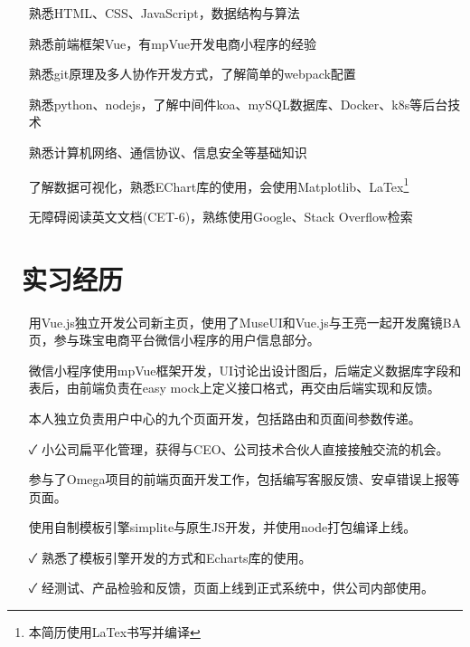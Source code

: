 \documentclass[14pt]{resume}
\begin{document}
\begin{itemize}
    \item[\faTree] 熟悉HTML、CSS、JavaScript，数据结构与算法
    \item[\faTree] 熟悉前端框架Vue，有mpVue开发电商小程序的经验
    \item[\faTree] 熟悉git原理及多人协作开发方式，了解简单的webpack配置
    \item[\faTree] 熟悉python、nodejs，了解中间件koa、mySQL数据库、Docker、k8s等后台技术
    \item[\faTree] 熟悉计算机网络、通信协议、信息安全等基础知识
    \item[\faTree] 了解数据可视化，熟悉EChart库的使用，会使用Matplotlib、LaTex\footnote{本简历使用LaTex书写并编译} 
    \item[\faTree] 无障碍阅读英文文档(CET-6)，熟练使用Google、Stack Overflow检索
\end{itemize}

\section{\faBriefcase\ 实习经历}

\begin{itemize}
    \item[\faFlagO] 用Vue.js独立开发公司新主页，使用了MuseUI和Vue.js与王亮一起开发魔镜BA页，参与珠宝电商平台微信小程序的用户信息部分。
    \item[\faFlagO] 微信小程序使用mpVue框架开发，UI讨论出设计图后，后端定义数据库字段和表后，由前端负责在easy mock上定义接口格式，再交由后端实现和反馈。
    \item[\faCode] 本人独立负责用户中心的九个页面开发，包括路由和页面间参数传递。 
    \item[\faCheck] 小公司扁平化管理，获得与CEO、公司技术合伙人直接接触交流的机会。
\end{itemize}


\begin{itemize}
    \item[\faFlagO] 参与了Omega项目的前端页面开发工作，包括编写客服反馈、安卓错误上报等页面。
    \item[\faCode] 使用自制模板引擎simplite与原生JS开发，并使用node打包编译上线。
    \item[\faCheck] 熟悉了模板引擎开发的方式和Echarts库的使用。
    \item[\faCheck] 经测试、产品检验和反馈，页面上线到正式系统中，供公司内部使用。 
\end{itemize}
\end{document}
